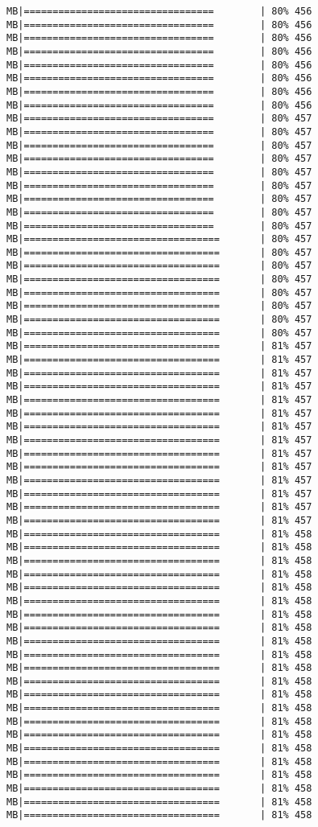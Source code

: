 \documentclass[
]{article}
\begin{document}
\begin{verbatim}
MB|=================================        | 80% 456 MB|=================================        | 80% 456 MB|=================================        | 80% 456 MB|=================================        | 80% 456 MB|=================================        | 80% 456 MB|=================================        | 80% 456 MB|=================================        | 80% 456 MB|=================================        | 80% 456 MB|=================================        | 80% 457 MB|=================================        | 80% 457 MB|=================================        | 80% 457 MB|=================================        | 80% 457 MB|=================================        | 80% 457 MB|=================================        | 80% 457 MB|=================================        | 80% 457 MB|=================================        | 80% 457 MB|=================================        | 80% 457 MB|==================================       | 80% 457 MB|==================================       | 80% 457 MB|==================================       | 80% 457 MB|==================================       | 80% 457 MB|==================================       | 80% 457 MB|==================================       | 80% 457 MB|==================================       | 80% 457 MB|==================================       | 80% 457 MB|==================================       | 81% 457 MB|==================================       | 81% 457 MB|==================================       | 81% 457 MB|==================================       | 81% 457 MB|==================================       | 81% 457 MB|==================================       | 81% 457 MB|==================================       | 81% 457 MB|==================================       | 81% 457 MB|==================================       | 81% 457 MB|==================================       | 81% 457 MB|==================================       | 81% 457 MB|==================================       | 81% 457 MB|==================================       | 81% 457 MB|==================================       | 81% 457 MB|==================================       | 81% 458 MB|==================================       | 81% 458 MB|==================================       | 81% 458 MB|==================================       | 81% 458 MB|==================================       | 81% 458 MB|==================================       | 81% 458 MB|==================================       | 81% 458 MB|==================================       | 81% 458 MB|==================================       | 81% 458 MB|==================================       | 81% 458 MB|==================================       | 81% 458 MB|==================================       | 81% 458 MB|==================================       | 81% 458 MB|==================================       | 81% 458 MB|==================================       | 81% 458 MB|==================================       | 81% 458 MB|==================================       | 81% 458 MB|==================================       | 81% 458 MB|==================================       | 81% 458 MB|==================================       | 81% 458 MB|==================================       | 81% 458 MB|==================================       | 81% 458 
\end{verbatim}
\end{document}
